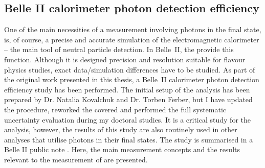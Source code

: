 \subsection{Belle II calorimeter photon detection efficiency}\label{sec:photon_efficiency}

One of the main necessities of a measurement involving photons in the final state, is, of course, a precise and accurate simulation of the electromagnetic calorimeter -- the main tool of neutral particle detection.
In Belle~II, the \ECL provide this function.
Although it is designed precision and resolution suitable for flavour physics studies, 
exact data/simulation differences have to be studied.
As part of the original work presented in this thesis, a Belle~II calorimeter photon detection efficiency study has been performed.
The initial setup of the analysis has been prepared by Dr. Natalia Kovalchuk and Dr. Torben Ferber, but I have updated the procedure, reworked the covered
and performed the full systematic uncertainty evaluation during my doctoral studies.
It is a critical study for the \BtoXsgamma analysis, however, the results of this study are also routinely used in other analyses that utilise photons in their final states.
The study is summarised in a Belle II public note \cite{Henrikas:2604}.
Here, the main measurement concepts and the results relevant to the measurement of \BtoXsgamma are presented.

